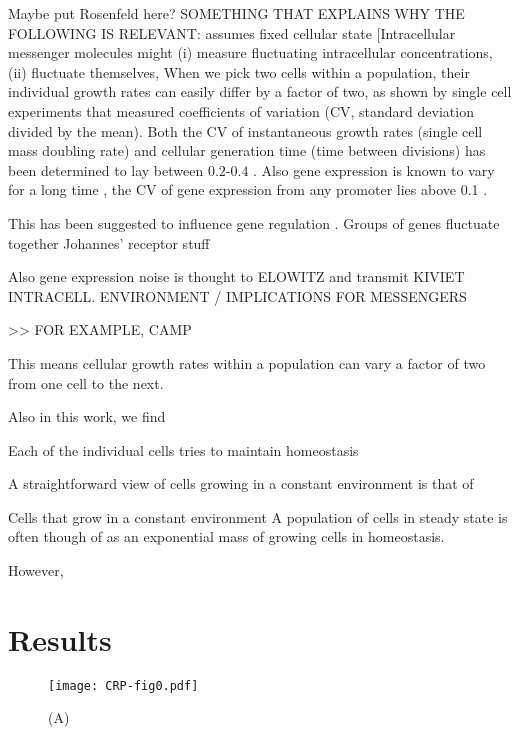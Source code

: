 Maybe put Rosenfeld here?
SOMETHING THAT EXPLAINS WHY THE FOLLOWING IS RELEVANT:
assumes fixed cellular state
[Intracellular messenger molecules might (i) measure fluctuating intracellular concentrations, (ii) fluctuate themselves, 
%
When we pick two cells within a population, their individual growth rates can easily differ by a factor of two, 
as shown by single cell experiments that measured coefficients of variation (CV, standard deviation divided by the mean).
%
Both the CV of instantaneous growth rates (single cell mass doubling rate) and cellular generation time (time between divisions) has been determined to lay between $0.2$-$0.4$ \cite{Kiviet2014, Hashimoto2016}.
%
Also gene expression is known to vary for a long time \cite{Elowitz2002}, 
the CV of gene expression from any promoter lies above 0.1 \cite{Keren2015}.


This has been suggested to influence gene regulation \cite{Rosenfeld2005}.
Groups of genes fluctuate together \cite{Stewart-Ornstein2012}
Johannes' receptor stuff


Also gene expression noise is thought to ELOWITZ
and transmit KIVIET
INTRACELL. ENVIRONMENT / IMPLICATIONS FOR MESSENGERS 

>> FOR EXAMPLE, CAMP

%
This means cellular growth rates within a population can vary a factor of two from one cell to the next.

Also in this work, we find 



Each of the individual cells tries to maintain homeostasis 


A straightforward view of cells growing in a constant environment is that of 

Cells that grow in a constant environment 
A population of cells in steady state is often though of as an exponential mass of growing cells in homeostasis.
%

% 
However, 

%
% 


\section{Results}

\begin{figure}
	\centering
	\texttt{[image: CRP-fig0.pdf]}
	\caption{ 
		(A) 
	}
	\label{fig:CRP:fig0}
\end{figure}


